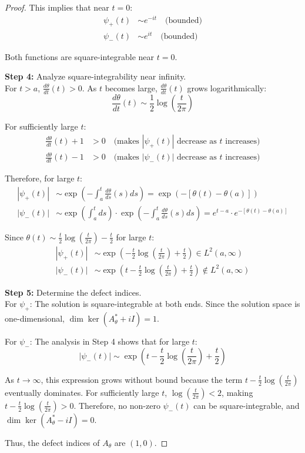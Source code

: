 \documentclass{article}
\theoremstyle{definition}
\begin{document}
\begin{proof}
This implies that near $t=0$:
\begin{align}
\psi_+(t) &\sim e^{-it} \quad \text{(bounded)}\\
\psi_-(t) &\sim e^{it} \quad \text{(bounded)}
\end{align}

Both functions are square-integrable near $t=0$.

\textbf{Step 4:} Analyze square-integrability near infinity.\\
For $t > a$, $\frac{d\theta}{dt}(t) > 0$. As $t$ becomes large, $\frac{d\theta}{dt}(t)$ grows logarithmically:
\begin{equation}
\frac{d\theta}{dt}(t) \sim \frac{1}{2}\log\left(\frac{t}{2\pi}\right)
\end{equation}

For sufficiently large $t$:
\begin{align}
\frac{d\theta}{dt}(t) + 1 &> 0 \quad \text{(makes $|\psi_+(t)|$ decrease as $t$ increases)}\\
\frac{d\theta}{dt}(t) - 1 &> 0 \quad \text{(makes $|\psi_-(t)|$ decrease as $t$ increases)}
\end{align}

Therefore, for large $t$:
\begin{align}
|\psi_+(t)| &\sim \exp\left(-\int_a^t \frac{d\theta}{ds}(s)ds\right) = \exp\left(-[\theta(t)-\theta(a)]\right)\\
|\psi_-(t)| &\sim \exp\left(\int_a^t ds\right) \cdot \exp\left(-\int_a^t \frac{d\theta}{ds}(s)ds\right) = e^{t-a} \cdot e^{-[\theta(t)-\theta(a)]}
\end{align}

Since $\theta(t) \sim \frac{t}{2}\log\left(\frac{t}{2\pi}\right) - \frac{t}{2}$ for large $t$:
\begin{align}
|\psi_+(t)| &\sim \exp\left(-\frac{t}{2}\log\left(\frac{t}{2\pi}\right) + \frac{t}{2}\right) \in L^2(a,\infty)\\
|\psi_-(t)| &\sim \exp\left(t - \frac{t}{2}\log\left(\frac{t}{2\pi}\right) + \frac{t}{2}\right) \notin L^2(a,\infty)
\end{align}

\textbf{Step 5:} Determine the defect indices.\\
For $\psi_+$: The solution is square-integrable at both ends. Since the solution space is one-dimensional, $\dim\ker(A_{\theta}^* + iI) = 1$.

For $\psi_-$: The analysis in Step 4 shows that for large $t$:
\begin{equation}
|\psi_-(t)| \sim \exp\left(t - \frac{t}{2}\log\left(\frac{t}{2\pi}\right) + \frac{t}{2}\right)
\end{equation}

As $t \to \infty$, this expression grows without bound because the term $t - \frac{t}{2}\log\left(\frac{t}{2\pi}\right)$ eventually dominates. For sufficiently large $t$, $\log\left(\frac{t}{2\pi}\right) < 2$, making $t - \frac{t}{2}\log\left(\frac{t}{2\pi}\right) > 0$. Therefore, no non-zero $\psi_-(t)$ can be square-integrable, and $\dim\ker(A_{\theta}^* - iI) = 0$.

Thus, the defect indices of $A_{\theta}$ are $(1,0)$.
\end{proof}
\end{document}
